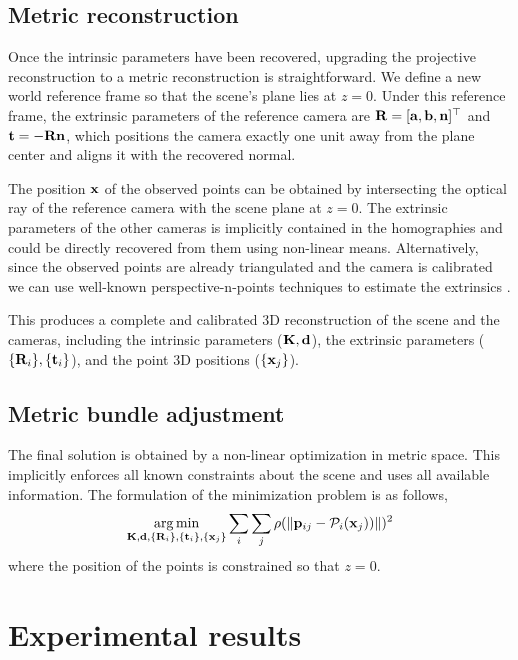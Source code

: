 \documentclass[10pt,twocolumn,letterpaper]{article}
\begin{document}
\subsection{Metric reconstruction}

Once the intrinsic parameters have been recovered, upgrading the projective reconstruction to a metric reconstruction is straightforward. We define a new world reference frame so that the scene's plane lies at $z=0$. Under this reference frame, the extrinsic parameters of the reference camera are $\mathbf{R}=[\mathbf{a}, \mathbf{b}, \mathbf{n}]^\top$ and $\mathbf{t}= - \mathbf{R} \mathbf{n}$, which positions the camera exactly one unit away from the plane center and aligns it with the recovered normal.

The position $\mathbf{x}$ of the observed points can be obtained by intersecting the optical ray of the reference camera with the scene plane at $z=0$. The extrinsic parameters of the other cameras is implicitly contained in the homographies and could be directly recovered from them using non-linear means. Alternatively, since the observed points are already triangulated and the camera is calibrated we can use well-known perspective-n-points techniques to estimate the extrinsics \cite{pnp}.

This produces a complete and calibrated 3D reconstruction of the scene and the cameras, including the intrinsic parameters ($\mathbf{K},\mathbf{d}$), the extrinsic parameters ($\lbrace \mathbf{R}_i \rbrace,\lbrace \mathbf{t}_i \rbrace$), and the point 3D positions ($\lbrace \mathbf{x}_j \rbrace$).

\subsection{Metric bundle adjustment}

The final solution is obtained by a non-linear optimization in metric space. This implicitly enforces all known constraints about the scene and uses all available information. The formulation of the minimization problem is as follows, 
%
\begin{align}
\argmin_{\Km,\dv,\lbrace \Rm_i \rbrace,\lbrace \tv_i \rbrace, \lbrace \xv_j \rbrace} 
%
\sum_i \sum_j \rho(\norm{\pv_{ij} - \Projection_i(\xv_j))})^2 
\end{align}
%
where the position of the points is constrained so that $z=0$. 

\section{Experimental results}
\label{sec:results}
\end{document}
